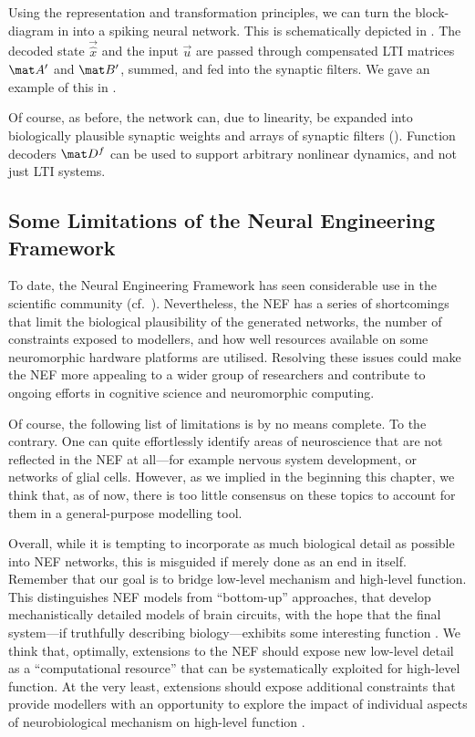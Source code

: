 Using the representation and transformation principles, we can turn the block-diagram in  into a spiking neural network.
This is schematically depicted in .
The decoded state $\vec{\hat x}$ and the input $\vec u$ are passed through compensated LTI matrices $\mat A'$ and $\mat B'$, summed, and fed into the synaptic filters.
We gave an example of this in .

Of course, as before, the network can, due to linearity, be expanded into biologically plausible synaptic weights and arrays of synaptic filters ().
Function decoders $\mat D^f$ can be used to support arbitrary nonlinear dynamics, and not just LTI systems.

\subsection{Some Limitations of the Neural Engineering Framework}
\label{sec:nef_limitations}

To date, the Neural Engineering Framework has seen considerable use in the scientific community (cf.~).
Nevertheless, the NEF has a series of shortcomings that limit the biological plausibility of the generated networks, the number of constraints exposed to modellers, and how well resources available on some neuromorphic hardware platforms are utilised.
Resolving these issues could make the NEF more appealing to a wider group of researchers and contribute to ongoing efforts in cognitive science and neuromorphic computing.

Of course, the following list of limitations is by no means complete.
To the contrary.
One can quite effortlessly identify areas of neuroscience that are not reflected in the NEF at all---for example nervous system development, or networks of glial cells.
However, as we implied in the beginning this chapter, we think that, as of now, there is too little consensus on these topics to account for them in a general-purpose modelling tool.

Overall, while it is tempting to incorporate as much biological detail as possible into NEF networks, this is misguided if merely done as an end in itself.
Remember that our goal is to bridge low-level mechanism and high-level function.
This distinguishes NEF models from \enquote{bottom-up} approaches, that develop mechanistically detailed models of brain circuits, with the hope that the final system---if truthfully describing biology---exhibits some interesting function \citep[cf.][]{komer2016unified}.
We think that, optimally, extensions to the NEF should expose new low-level detail as a \enquote{computational resource} that can be systematically exploited for high-level function.
At the very least, extensions should expose additional constraints that provide modellers with an opportunity to explore the impact of individual aspects of neurobiological mechanism on high-level function \citep[e.g.,][]{duggins2017incorporating}.

